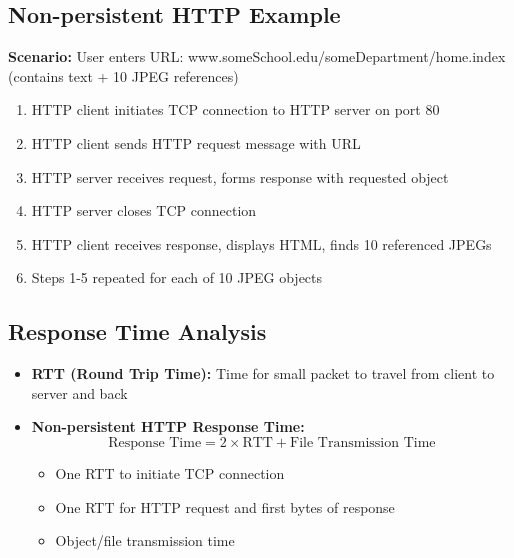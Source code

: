 \documentclass[12pt]{article}
\begin{document}
\subsection{Non-persistent HTTP Example}
\textbf{Scenario:} User enters URL: www.someSchool.edu/someDepartment/home.index (contains text + 10 JPEG references)

\begin{enumerate}
    \item HTTP client initiates TCP connection to HTTP server on port 80
    \item HTTP client sends HTTP request message with URL
    \item HTTP server receives request, forms response with requested object
    \item HTTP server closes TCP connection
    \item HTTP client receives response, displays HTML, finds 10 referenced JPEGs
    \item Steps 1-5 repeated for each of 10 JPEG objects
\end{enumerate}

\subsection{Response Time Analysis}
\begin{itemize}
    \item \textbf{RTT (Round Trip Time):} Time for small packet to travel from client to server and back
    \item \textbf{Non-persistent HTTP Response Time:}
          \[ \text{Response Time} = 2 \times \text{RTT} + \text{File Transmission Time} \]
          \begin{itemize}
              \item One RTT to initiate TCP connection
              \item One RTT for HTTP request and first bytes of response
              \item Object/file transmission time
          \end{itemize}
\end{itemize}
\end{document}
